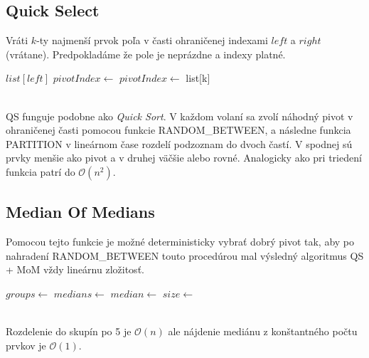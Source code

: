 \documentclass[paper=a4, fontsize=11pt]{scrartcl} %
\numberwithin{equation}{section} %
\numberwithin{figure}{section} %
\numberwithin{table}{section} %
\begin{document}
\subsection*{Quick Select}
Vráti $k$-ty najmenší prvok poľa v časti ohraničenej indexami $left$ a $right$ (vrátane). Predpokladáme že pole je neprázdne a indexy platné. \\

\begin{algorithmic}[1]
            \State \Return $list[left]$
        \EndIf
       	\State $pivotIndex \gets$ 
        \State $pivotIndex \gets$ 
            \State \Return list[k]
            \State \Return {}
        \Else
            \State \Return {}
        \EndIf
    \EndFunction
\end{algorithmic}
\ \\
QS funguje podobne ako {\em Quick Sort}. V každom volaní sa zvolí náhodný pivot v ohraničenej časti pomocou funkcie RANDOM\_BETWEEN, a následne funkcia PARTITION v lineárnom čase rozdelí podzoznam do dvoch častí. V spodnej sú prvky menšie ako pivot a v druhej väčšie alebo rovné. Analogicky ako pri triedení funkcia patrí do $\mathcal{O}(n^2)$. \\

\subsection*{Median Of Medians}
Pomocou tejto funkcie je možné deterministicky vybrať dobrý pivot tak, aby po nahradení RANDOM\_BETWEEN touto procedúrou mal výsledný algoritmus QS + MoM vždy lineárnu zložitosť. \\

\begin{algorithmic}[1]
        \State $groups \gets$ 
        \State $medians \gets$ 
            \State $median \gets$ 
            \State {}
        \EndFor
       \State $size \gets$ 
       \State \Return {}
    \EndFunction
\end{algorithmic}
\ \\
Rozdelenie do skupín po 5 je $\mathcal{O}(n)$ ale nájdenie mediánu z konštantného počtu prvkov je $\mathcal{O}(1)$. \\
\end{document}

